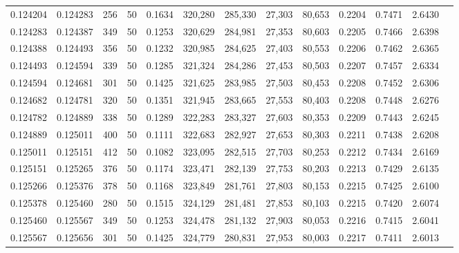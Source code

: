 \begin{tabular}{rrrrrrrrrrrrr}
0.124204 & 0.124283 &   256 &  50 &                                     0.1634 & 320,280 & 285,330 &  27,303 &  80,653 & 0.2204 & 0.7471 & 2.6430 \\
0.124283 & 0.124387 &   349 &  50 &                                     0.1253 & 320,629 & 284,981 &  27,353 &  80,603 & 0.2205 & 0.7466 & 2.6398 \\
0.124388 & 0.124493 &   356 &  50 &                                     0.1232 & 320,985 & 284,625 &  27,403 &  80,553 & 0.2206 & 0.7462 & 2.6365 \\
0.124493 & 0.124594 &   339 &  50 &                                     0.1285 & 321,324 & 284,286 &  27,453 &  80,503 & 0.2207 & 0.7457 & 2.6334 \\
0.124594 & 0.124681 &   301 &  50 &                                     0.1425 & 321,625 & 283,985 &  27,503 &  80,453 & 0.2208 & 0.7452 & 2.6306 \\
0.124682 & 0.124781 &   320 &  50 &                                     0.1351 & 321,945 & 283,665 &  27,553 &  80,403 & 0.2208 & 0.7448 & 2.6276 \\
0.124782 & 0.124889 &   338 &  50 &                                     0.1289 & 322,283 & 283,327 &  27,603 &  80,353 & 0.2209 & 0.7443 & 2.6245 \\
0.124889 & 0.125011 &   400 &  50 &                                     0.1111 & 322,683 & 282,927 &  27,653 &  80,303 & 0.2211 & 0.7438 & 2.6208 \\
0.125011 & 0.125151 &   412 &  50 &                                     0.1082 & 323,095 & 282,515 &  27,703 &  80,253 & 0.2212 & 0.7434 & 2.6169 \\
0.125151 & 0.125265 &   376 &  50 &                                     0.1174 & 323,471 & 282,139 &  27,753 &  80,203 & 0.2213 & 0.7429 & 2.6135 \\
0.125266 & 0.125376 &   378 &  50 &                                     0.1168 & 323,849 & 281,761 &  27,803 &  80,153 & 0.2215 & 0.7425 & 2.6100 \\
0.125378 & 0.125460 &   280 &  50 &                                     0.1515 & 324,129 & 281,481 &  27,853 &  80,103 & 0.2215 & 0.7420 & 2.6074 \\
0.125460 & 0.125567 &   349 &  50 &                                     0.1253 & 324,478 & 281,132 &  27,903 &  80,053 & 0.2216 & 0.7415 & 2.6041 \\
0.125567 & 0.125656 &   301 &  50 &                                     0.1425 & 324,779 & 280,831 &  27,953 &  80,003 & 0.2217 & 0.7411 & 2.6013 \\

\end{tabular}
